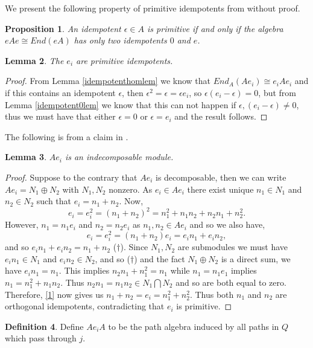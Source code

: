 \documentclass[11.5pt, twoside, a4paper, titlepage]{report}
\theoremstyle{definition}
\newtheorem{mydef}{Definition}[section]
\theoremstyle{plain}
\newtheorem{lem}[mydef]{Lemma}
\newtheorem{prop}[mydef]{Proposition}
\begin{document}
We present the following property of primitive idempotents from \cite{Assem} without proof.
\begin{prop}
An idempotent $\epsilon \in A$ is primitive if and only if the algebra $eAe \cong End(eA)$ has only two idempotents $0$ and $e$.
\end{prop}

\begin{lem}
The $e_i$ are primitive idempotents.
\end{lem}
\begin{proof}
From Lemma \ref{idempotenthomlem} we know that $End_A(Ae_i) \cong e_iAe_i$ and if this contains an idempotent $\epsilon$, then $\epsilon^2=\epsilon=\epsilon e_i$, so $\epsilon(e_i- \epsilon)=0$, but from Lemma \ref{idempotent0lem} we know that this can not happen if $\epsilon, (e_i-\epsilon) \neq 0$, thus we must have that either $\epsilon=0$ or $\epsilon=e_i$ and the result follows.
\end{proof}

The following is from a claim in \cite{Vale}.
\begin{lem}
$Ae_i$ is an indecomposable module.
\end{lem}
\begin{proof}
Suppose to the contrary that $Ae_i$ is decomposable, then we can write $Ae_i=N_1\oplus N_2$ with $N_1,N_2$ nonzero. As $e_i \in Ae_i$ there exist unique $n_1\in N_1$ and $n_2\in N_2$ such that $e_i=n_1+n_2$. Now,
\begin{equation} \label{1}
e_i=e_i^2=(n_1+n_2)^2=n_1^2+ n_1n_2 +n_2n_1+n_2^2.
\end{equation}
However, $n_1=n_1e_i$ and $n_2=n_2e_i$ as $n_1,n_2\in Ae_i$ and so we also have,
\begin{equation*}
e_i=e_i^2=(n_1+n_2)e_i=e_in_1+e_in_2,
\end{equation*}
and so $e_in_1+e_in_2=n_1+n_2$ ($\dagger$). Since $N_1, N_2$ are submodules we must have $e_in_1\in N_1$ and $e_in_2\in N_2$, and so ($\dagger$) and  the fact $N_1\oplus N_2$ is a direct sum, we have $e_in_1=n_1$. This implies $n_2n_1+n_1^2=n_1$ while $n_1=n_1e_1$ implies $n_1=n_1^2+n_1n_2$. Thus $n_2n_1=n_1n_2 \in N_1 \bigcap N_2$ and so are both equal to zero. Therefore, \ref{1} now gives us $n_1+n_2=e_i=n_1^2+n_2^2$. Thus both $n_1$ and $n_2$ are orthogonal idempotents, contradicting that $e_i$ is primitive. 
\end{proof}

\begin{mydef}
Define $Ae_iA$ to be the path algebra induced by all paths in $Q$ which pass through $j$. 
\end{mydef}
\end{document}
